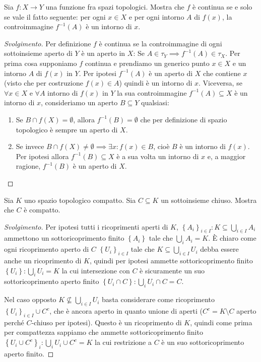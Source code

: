\documentclass[a4paper, 12pt, italian]{article}
\begin{document}
\begin{exercise}
Sia $f: X \to Y$ una funzione fra spazi topologici. Mostra che $f$ è
continua se e solo se vale il fatto seguente: per ogni $x \in X$ e per ogni
intorno $A$ di $f(x)$, la controimmagine $f^{-1}(A)$ è un intorno di $x$.
\begin{proof}[Svolgimento]
Per definizione $f$ è continua se la controimmagine di ogni sottoinsieme
aperto di $Y$ è un aperto in $X$:
Se $A \in \tau_Y \implies f^{-1}(A) \in \tau_X$. Per prima cosa supponiamo
$f$ continua e prendiamo un generico punto $x \in X$ e un intorno $A$ di $f(x)$
in $Y$. Per ipotesi $f^{-1}(A)$ è un aperto di $X$ che contiene $x$ (visto
che per costruzione $f(x) \in A$) quindi è un intorno di $x$.\newline
Viceversa, se $\forall x \in X$ e $\forall A$ intorno di $f(x)$ in $Y$ la sua
controimmagine $f^{-1}(A) \subseteq X$ è un intorno di $x$, consideriamo un
aperto $B \subseteq Y$ qualsiasi:
\begin{enumerate}
\item Se $B \cap f(X) = \emptyset$, allora $f^{-1}(B) = \emptyset$ che per
definizione di spazio topologico è sempre un aperto di $X$.
\item Se invece $B \cap f(X) \neq \emptyset \implies \exists x: f(x) \in B$,
cioè $B$ è un intorno di $f(x)$. Per ipotesi allora $f^{-1}(B) \subseteq X$ 
è a sua volta un intorno di $x$ e, a maggior ragione, $f^{-1}(B)$ è un
aperto di $X$.
\end{enumerate}
\end{proof}
\end{exercise}


\begin{exercise}
Sia $K$ uno spazio topologico compatto. Sia $C \subseteq K$ un sottoinsieme
chiuso. Mostra che $C$ è compatto.
\begin{proof}[Svolgimento]
Per ipotesi tutti i ricoprimenti aperti di $K$, $\left\{A_i\right\}_{i \in I} : K \subseteq \bigcup_{i \in I} A_i$ ammettono un sottoricoprimento
finito $\left\{A_i\right\}$ tale che $\bigcup_i A_i = K$.
\`E chiaro come ogni ricoprimento aperto di $C$ $\left\{U_i\right\}_{i \in I}$
tale che $K \subseteq \bigcup_{i \in I} U_i$ debba essere anche un
ricoprimento di $K$, quindi per ipotesi ammette sottoricoprimento finito
$\left\{U_i\right\} : \bigcup_i U_i = K$ la cui intersezione con $C$ è
sicuramente un suo sottoricoprimento aperto finito
$\left\{U_i \cap C\right\} : \bigcup_i U_i \cap C = C$.

Nel caso opposto $K \nsubseteq \bigcup_{i \in I} U_i$ basta considerare
come ricoprimento $\left\{U_i \right\}_{i \in I} \cup C^c$, che è
ancora aperto in quanto unione di aperti ($C^c = K \setminus C$ aperto perché
$C$-chiuso per ipotesi). Questo è un ricoprimento di $K$, quindi come prima
per compattezza sappiamo che ammette sottoricoprimento finito
$\left\{U_i \cup C^c \right\}_i :  \bigcup_i U_i \cup C^c =K$ la cui
restrizione a $C$ è un suo sottoricoprimento aperto finito.
\end{proof}
\end{exercise}
\end{document}
